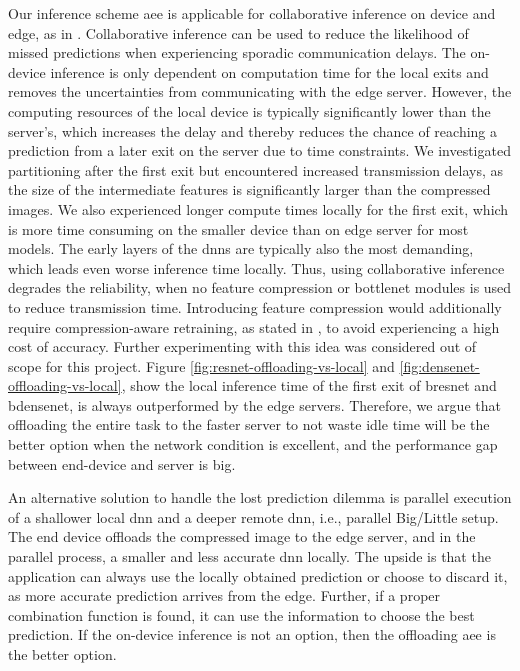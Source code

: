 Our inference scheme \gls{aee} is applicable for collaborative inference on device and edge, as in \cite{leroux_cascading_2017,teerapittayanon_distributed_2017}. Collaborative inference can be used to reduce the likelihood of missed predictions when experiencing sporadic communication delays. The on-device inference is only dependent on computation time for the local exits and removes the uncertainties from communicating with the edge server. However, the computing resources of the local device is typically significantly lower than the server's, which increases the delay and thereby reduces the chance of reaching a prediction from a later exit on the server due to time constraints. We investigated partitioning after the first exit but encountered increased transmission delays, as the size of the intermediate features is significantly larger than the compressed images. We also experienced longer compute times locally for the first exit, which is more time consuming on the smaller device than on edge server for most models. The early layers of the \gls{dnn}s are typically also the most demanding, which leads even worse inference time locally. Thus, using collaborative inference degrades the reliability, when no feature compression or \gls{bottlenet} modules is used to reduce transmission time. Introducing feature compression would additionally require compression-aware retraining, as stated in \cite{choi_near-lossless_2018,choi_near-lossless_2018,eshratifar_bottlenet:_2019},  to avoid experiencing a high cost of accuracy. Further experimenting with this idea was considered out of scope for this project. Figure \ref{fig:resnet-offloading-vs-local} and \ref{fig:densenet-offloading-vs-local}, show the local inference time of the first exit of \gls{bresnet} and \gls{bdensenet}, is always outperformed by the edge servers. Therefore, we argue that offloading the entire task to the faster server to not waste idle time will be the better option when the network condition is excellent, and the performance gap between end-device and server is big.

An alternative solution to handle the lost prediction dilemma is parallel execution of a shallower local \gls{dnn} and a deeper remote \gls{dnn}, i.e., parallel Big/Little setup. The end device offloads the compressed image to the edge server, and in the parallel process, a smaller and less accurate \gls{dnn} locally. The upside is that the application can always use the locally obtained prediction or choose to discard it, as more accurate prediction arrives from the edge. Further, if a proper combination function is found, it can use the information to choose the best prediction. If the on-device inference is not an option, then the offloading \gls{aee} is the better option.

